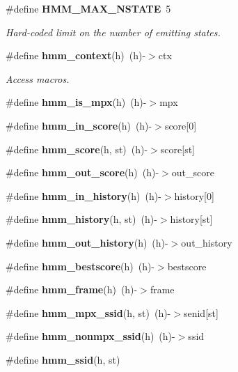 \begin{DoxyCompactItemize}
\mbox{\label{hmm_8h_a1eb055ab0e55008f27d78e7b07a55a1c}} 
\#define \textbf{ H\+M\+M\+\_\+\+M\+A\+X\+\_\+\+N\+S\+T\+A\+TE}~5
\begin{DoxyCompactList}\small\item\em Hard-\/coded limit on the number of emitting states. \end{DoxyCompactList}\item 
\#define \textbf{ hmm\+\_\+context}(h)~(h)-\/$>$ctx
\begin{DoxyCompactList}\small\item\em Access macros. \end{DoxyCompactList}\item 
\mbox{\label{hmm_8h_a9bb998720796e947722c4e0e36b55c61}} 
\#define {\bfseries hmm\+\_\+is\+\_\+mpx}(h)~(h)-\/$>$mpx
\item 
\mbox{\label{hmm_8h_a3b6af4838a0485b4d44c04680e2e5bf6}} 
\#define {\bfseries hmm\+\_\+in\+\_\+score}(h)~(h)-\/$>$score[0]
\item 
\mbox{\label{hmm_8h_ae7ff8a1aba5458c587868ebf5a9898d4}} 
\#define {\bfseries hmm\+\_\+score}(h,  st)~(h)-\/$>$score[st]
\item 
\mbox{\label{hmm_8h_a196fd6a12e2d34e19d17f1338aa66727}} 
\#define {\bfseries hmm\+\_\+out\+\_\+score}(h)~(h)-\/$>$out\+\_\+score
\item 
\mbox{\label{hmm_8h_a4569baec920021f78c92976049fabe1b}} 
\#define {\bfseries hmm\+\_\+in\+\_\+history}(h)~(h)-\/$>$history[0]
\item 
\mbox{\label{hmm_8h_a1ad265671ea1ec72913641444adf3cda}} 
\#define {\bfseries hmm\+\_\+history}(h,  st)~(h)-\/$>$history[st]
\item 
\mbox{\label{hmm_8h_ad2c9f925fe7f3edd761391e524ccbe81}} 
\#define {\bfseries hmm\+\_\+out\+\_\+history}(h)~(h)-\/$>$out\+\_\+history
\item 
\mbox{\label{hmm_8h_a59323e9a29074f3d1fd4cc07b310785e}} 
\#define {\bfseries hmm\+\_\+bestscore}(h)~(h)-\/$>$bestscore
\item 
\mbox{\label{hmm_8h_aef81c7d2e36140c8f9873b8a49fbbf12}} 
\#define {\bfseries hmm\+\_\+frame}(h)~(h)-\/$>$frame
\item 
\mbox{\label{hmm_8h_ad00a55e9d9e9fdfa030da184cdb4c2ba}} 
\#define {\bfseries hmm\+\_\+mpx\+\_\+ssid}(h,  st)~(h)-\/$>$senid[st]
\item 
\mbox{\label{hmm_8h_a1c0be1206da75b5c560524549de72f7d}} 
\#define {\bfseries hmm\+\_\+nonmpx\+\_\+ssid}(h)~(h)-\/$>$ssid
\item 
\#define {\bfseries hmm\+\_\+ssid}(h,  st)

\end{DoxyCompactItemize}
